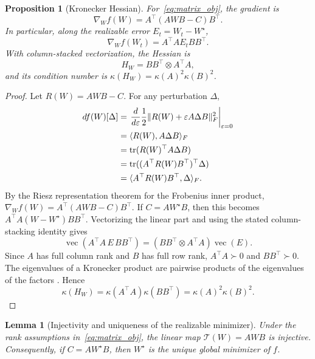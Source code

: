 \documentclass[sigconf,nonacm]{acmart}
\newtheorem{proposition}{Proposition}
\newtheorem{lemma}{Lemma}
\begin{document}
\begin{proposition}[Kronecker Hessian]\label{prop:matrix_hessian}
For~\eqref{eq:matrix_obj}, the gradient is
\begin{equation}
  \nabla_W f(W)=A^\top(AWB-C)B^\top .
\end{equation}
In particular, along the realizable error $E_t=W_t-W^\star$,
\begin{equation}
  \nabla_W f(W_t)=A^\top A E_t BB^\top.
\end{equation}
With column-stacked vectorization, the Hessian is
\begin{equation}
  H_W=BB^\top\otimes A^\top A,
\end{equation}
and its condition number is $\kappa(H_W)=\kappa(A)^2\kappa(B)^2$.
\end{proposition}

\begin{proof}
Let $R(W)=AWB-C$. For any perturbation $\Delta$,
\begin{align}
  df(W)[\Delta]
  &=\left.\frac{d}{d\varepsilon}\frac12\|R(W)+\varepsilon A\Delta B\|_F^2\right|_{\varepsilon=0}\notag\\
  &=\langle R(W),A\Delta B\rangle_F \\
  &=\operatorname{tr}(R(W)^\top A\Delta B)\notag\\
  &=\operatorname{tr}((A^\top R(W)B^\top)^\top\Delta)\notag\\
  &=\langle A^\top R(W)B^\top,\Delta\rangle_F .
\end{align}
By the Riesz representation theorem for the Frobenius inner product, $\nabla_W f(W)=A^\top(AWB-C)B^\top$. If $C=AW^\star B$, then this becomes $A^\top A(W-W^\star)BB^\top$. Vectorizing the linear part and using the stated column-stacking identity gives
\begin{equation}
  \operatorname{vec}(A^\top A\,E\,BB^\top)
  =(BB^\top\otimes A^\top A)\operatorname{vec}(E).
\end{equation}
Since $A$ has full column rank and $B$ has full row rank, $A^\top A\succ0$ and $BB^\top\succ0$. The eigenvalues of a Kronecker product are pairwise products of the eigenvalues of the factors \citep{horn2012matrix}. Hence
\begin{equation}
  \kappa(H_W)=\kappa(A^\top A)\kappa(BB^\top)=\kappa(A)^2\kappa(B)^2.
\end{equation}
\end{proof}

\begin{lemma}[Injectivity and uniqueness of the realizable minimizer]\label{lem:injective}
Under the rank assumptions in~\eqref{eq:matrix_obj}, the linear map $\mathcal{T}(W)=AWB$ is injective. Consequently, if $C=AW^\star B$, then $W^\star$ is the unique global minimizer of $f$.
\end{lemma}
\end{document}
